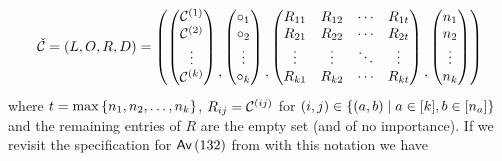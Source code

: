 \[
    \check{\mathcal{C}} = (L,O,R,D) = 
    \left(
    \begin{pmatrix}
        \mathcal{C}^{\left(1\right)}\\ \mathcal{C}^{\left(2\right)}\\ \vdots\\ \mathcal{C}^{\left(k\right)}
    \end{pmatrix}
    \begin{matrix}\\ \\ \\,\end{matrix}
    \begin{pmatrix}
        \circ_1\\\circ_2\\\vdots\\\circ_k
    \end{pmatrix}
    \begin{matrix}\\ \\ \\,\end{matrix}
    \begin{pmatrix}
    R_{11} & R_{12} & \dotsm & R_{1t} \\
    R_{21} & R_{22} & \dotsm & R_{2t} \\
    \vdots & \vdots & \ddots & \vdots \\
    R_{k1} & R_{k2} & \dotsm & R_{kt}
    \end{pmatrix}
    \begin{matrix}\\ \\ \\,\end{matrix}
    \begin{pmatrix}
        n_1\\n_2\\\vdots\\n_k
    \end{pmatrix}
    \right)
\]
where $t = \max\left\{n_1,n_2,\dotsc,n_k\right\}$, $R_{ij} = \mathcal{C}^{\left(ij\right)}$ for $(i,j) \in \left\{(a,b) \mid a \in [k], b \in [n_a]\right\}$ and the remaining entries of $R$ are the empty set (and of no importance). If we revisit the specification for $\textsf{Av}\left(132\right)$ from  with this notation we have 
